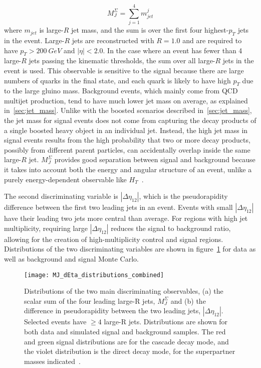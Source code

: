 \begin{equation}
    M_{J}^{\Sigma} = \sum_{j=1}^{4}m_{jet}^j
\end{equation}
where $m_{jet}$ is large-$R$ jet mass, and the sum is over the first four highest-$p_{T}$ jets in the event.
Large-$R$ jets are reconstructed with $R=1.0$ and are required to have $p_{T}>200~GeV$ and $|\eta|<2.0$.
In the case where an event has fewer than 4 large-$R$ jets passing the kinematic thresholds, the sum over all large-$R$ jets in the event is used.
This observable is sensitive to the signal because there are large numbers of quarks in the final state, and each quark is likely to have high $p_{T}$ due to the large gluino mass.
Background events, which mainly come from QCD multijet production, tend to have much lower jet mass on average, as explained in~\ref{sec:jet_mass}.
Unlike with the boosted scenarios described in~\ref{sec:jet_mass}, the jet mass for signal events does not come from capturing the decay products of a single boosted heavy object in an individual jet.
Instead, the high jet mass in signal events results from the high probability that two or more decay products, possibly from different parent particles, can accidentally overlap inside the same large-$R$ jet.
$M_{J}^{\Sigma}$ provides good separation between signal and background because it takes into account both the energy and angular structure of an event, unlike a purely energy-dependent observable like $H_{T}$~\cite{hook-mj,elhedri-mj}.

The second discriminating variable is $|\Delta \eta_{12}|$, which is the pseudorapidity difference between the first two leading jets in an event.
Events with small $|\Delta \eta_{12}|$ have their leading two jets more central than average.
For regions with high jet multiplicity, requiring large $|\Delta \eta_{12}|$ reduces the signal to background ratio, allowing for the creation of high-multiplicity control and signal regions.
Distributions of the two discriminating variables are shown in figure~\ref{fig:MJ_dEta_distributions} for data as well as background and signal Monte Carlo.

\begin{figure}[!ht]
    \centering
    \texttt{[image: MJ\_dEta\_distributions\_combined]}
    \caption{Distributions of the two main discriminating observables, (a) the scalar sum of the four leading large-R jets, $M_{J}^{\Sigma}$ and (b) the difference in pseudorapidity between the two leading jets, $|\Delta\eta_{12}|$.
    Selected events have $\geq 4$ large-R jets.
    Distributions are shown for both data and simulated signal and background samples.
    The red and green signal distributions are for the cascade decay mode, and the violet distribution is the direct decay mode, for the superpartner masses indicated~\cite{paper-plb}.}
    \label{fig:MJ_dEta_distributions}
\end{figure}

